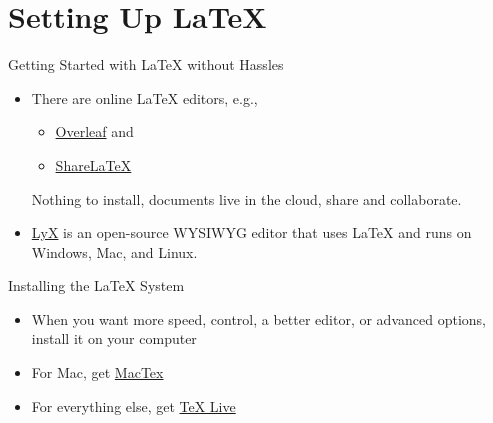\section{Setting Up \LaTeX}


\begin{frame}{Getting Started with \LaTeX{} without Hassles}

\begin{itemize}
\item There are online \LaTeX{} editors, e.g.,
\begin{itemize}
\item \href{https://www.overleaf.com/}{Overleaf} and 
\item \href{https://www.sharelatex.com/}{ShareLaTeX}
\end{itemize}
Nothing to install, documents live in the cloud, share and collaborate.
\item \href{http://www.lyx.org/}{LyX} is an open-source WYSIWYG editor
  that uses \LaTeX{} and runs on Windows, Mac, and Linux.
\end{itemize}

\end{frame}

\begin{frame}{Installing the \LaTeX{} System}

\begin{itemize}
\item When you want more speed, control, a better editor, or advanced 
options, install it on your computer
\item For Mac, get \href{http://www.tug.org/mactex/}{MacTex}
\item For everything else, get \href{http://www.tug.org/texlive/}{TeX Live}
\end{itemize}

\end{frame}

